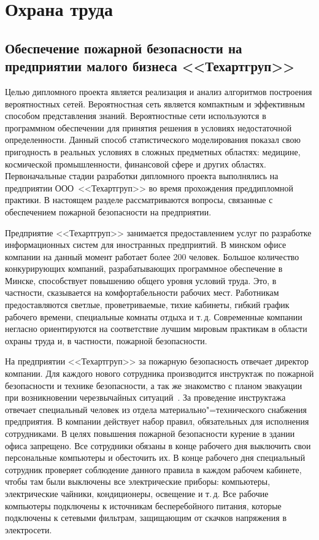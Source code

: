 \newcommand{\companyname}{\mbox{<<Техартгруп>>}}

\section{Охрана труда}

\subsection[Обеспечение пожарной безопасности на предприятии]{Обеспечение пожарной безопасности на предприятии малого бизнеса \companyname{}}


Целью дипломного проекта является реализация и анализ алгоритмов построения вероятностных сетей.
Вероятностная сеть является компактным и эффективным способом представления знаний.
Вероятностные сети используются в программном обеспечении для принятия решения в условиях недостаточной определенности.
Данный способ статистического моделирования показал свою пригодность в реальных условиях в сложных предметных областях: медицине, космической промышленности, финансовой сфере и других областях.
Первоначальные стадии разработки дипломного проекта выполнялись на предприятии ООО~\companyname{} во время прохождения преддипломной практики.
В настоящем разделе рассматриваются вопросы, связанные с обеспечением пожарной безопасности на предприятии.

Предприятие \companyname{} занимается предоставлением услуг по разработке информационных систем для иностранных предприятий. 
В минском офисе компании на данный момент работает более 200 человек. 
Большое количество конкурирующих компаний, разрабатывающих программное обеспечение в Минске, способствует повышению общего уровня условий труда.
Это, в частности, сказывается на комфортабельности рабочих мест.
Работникам предоставляются светлые, проветриваемые, тихие кабинеты, гибкий график рабочего времени, специальные комнаты отдыха и т.\,д.
Современные компании негласно ориентируются на соответствие лучшим мировым практикам в области охраны труда и, в частности, пожарной безопасности.

На предприятии \companyname{} за пожарную безопасность отвечает директор компании.
Для каждого нового сотрудника производится инструктаж по пожарной безопасности и технике безопасности, а так же знакомство с планом эвакуации при возникновении черезвычайных ситуаций~\cite[\ignore{раздел~5.5.8,} с.~324]{michnuk_2009}.
За проведение инструктажа отвечает специальный человек из отдела материально"=технического снабжения предприятия.
В компании действует набор правил, обязательных для исполнения сотрудниками.
В целях повышения пожарной безопасности курение в здании офиса запрещено.
Все сотрудники обязаны в конце рабочего дня выключить свои персональные компьютеры и обесточить их.
В конце рабочего дня специальный сотрудник проверяет соблюдение данного правила в каждом рабочем кабинете, чтобы там были выключены все электрические приборы: компьютеры, электрические чайники, кондиционеры, освещение и т.\,д.
Все рабочие компьютеры подключены к источникам бесперебойного питания, которые подключены к сетевыми фильтрам, защищающим от скачков напряжения в электросети.


